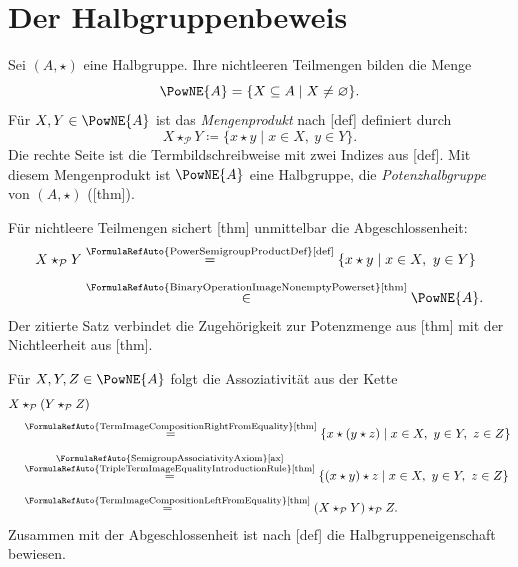 \chapter*{Der Halbgruppenbeweis}
\hypertarget{power.reading}{}

Sei \((A,\star)\) eine Halbgruppe. Ihre nichtleeren Teilmengen bilden
die Menge
\[
 \PowNE{A}=\{X\subseteq A\mid X\ne\varnothing\}.
\]
Für \(X,Y\in\PowNE{A}\) ist das \emph{Mengenprodukt} nach
[def] definiert durch
\[
 X\star_{\mathcal P}Y
   \coloneqq\{x\star y\mid x\in X,\ y\in Y\}.
\]
Die rechte Seite ist die Termbildschreibweise mit zwei Indizes aus
[def].
Mit diesem Mengenprodukt ist \(\PowNE{A}\) eine Halbgruppe, die
\emph{Potenzhalbgruppe} von \((A,\star)\)
([thm]).

Für nichtleere Teilmengen sichert
[thm] unmittelbar die Abgeschlossenheit:
\[
 \begin{aligned}
 X\star_{\mathcal P}Y
 &\overset{\text{\FormulaRefAuto{PowerSemigroupProductDef}[def]}}{=}
   \{x\star y\mid x\in X,\ y\in Y\}\\[5pt]
 &\overset{\text{\FormulaRefAuto{BinaryOperationImageNonemptyPowerset}[thm]}}{\in}
   \PowNE{A}.
 \end{aligned}
\]
Der zitierte Satz verbindet die Zugehörigkeit zur Potenzmenge aus
[thm] mit der Nichtleerheit aus
[thm].

Für \(X,Y,Z\in\PowNE{A}\) folgt die Assoziativität aus der Kette
\[
 \begin{aligned}
 &X\star_{\mathcal P}(Y\star_{\mathcal P}Z)\\[3pt]
 &\quad\overset{\text{\FormulaRefAuto{TermImageCompositionRightFromEquality}[thm]}}{=}
   \{x\star(y\star z)\mid x\in X,\ y\in Y,\ z\in Z\}\\[5pt]
 &\quad\overset{\substack{\text{\FormulaRefAuto{SemigroupAssociativityAxiom}[ax]}\\
                         \text{\FormulaRefAuto{TripleTermImageEqualityIntroductionRule}[thm]}}}{=}
   \{(x\star y)\star z\mid x\in X,\ y\in Y,\ z\in Z\}\\[5pt]
 &\quad\overset{\text{\FormulaRefAuto{TermImageCompositionLeftFromEquality}[thm]}}{=}
   (X\star_{\mathcal P}Y)\star_{\mathcal P}Z.
 \end{aligned}
\]
Zusammen mit der Abgeschlossenheit ist nach
[def] die Halbgruppeneigenschaft bewiesen.

